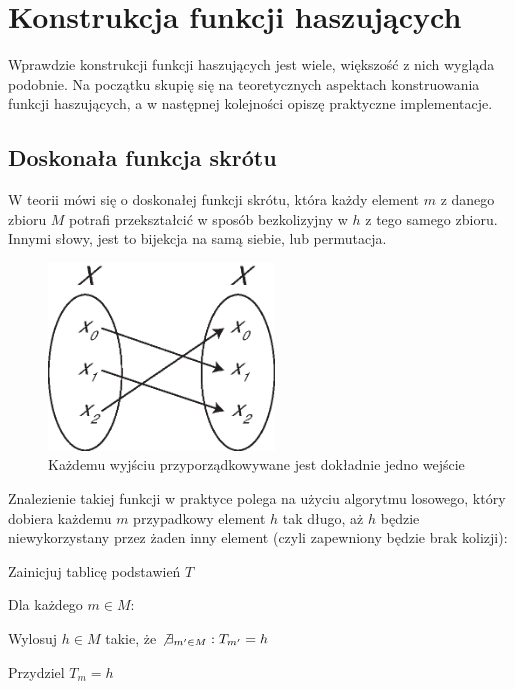 \documentclass[12pt,a4paper,twoside]{article}
\begin{document}
\section{Konstrukcja funkcji haszujących}
\label{sec:hash_construction}
Wprawdzie konstrukcji funkcji haszujących jest wiele, większość z nich wygląda
podobnie. Na początku skupię się na teoretycznych aspektach konstruowania
funkcji haszujących, a w następnej kolejności opiszę praktyczne implementacje.



\subsection{Doskonała funkcja skrótu}
W teorii mówi się o doskonałej funkcji skrótu, która każdy element $m$ z danego
zbioru $M$ potrafi przekształcić w sposób bezkolizyjny w $h$ z tego samego
zbioru. Innymi słowy, jest to bijekcja na samą siebie, lub permutacja.

\begin{figure}[htb!]
\includegraphics[width=6cm]{img/injection_self.eps}
\caption{Każdemu wyjściu przyporządkowywane jest dokładnie jedno wejście}
\label{fig:bijection}
\end{figure}


Znalezienie takiej funkcji w praktyce polega na użyciu algorytmu losowego,
który dobiera każdemu $m$ przypadkowy element $h$ tak długo, aż $h$ będzie
niewykorzystany przez żaden inny element (czyli zapewniony będzie brak
kolizji):

\begin{myenumerate}
\item Zainicjuj tablicę podstawień $T$
\item Dla każdego $m \in M$:
    \begin{myenumerate}
        \item Wylosuj $h \in M$ takie, że $\not \exists_{m' \in M} : T_{m'} = h$
        \item Przydziel $T_m = h$
    \end{myenumerate}
\end{myenumerate}
\end{document}
